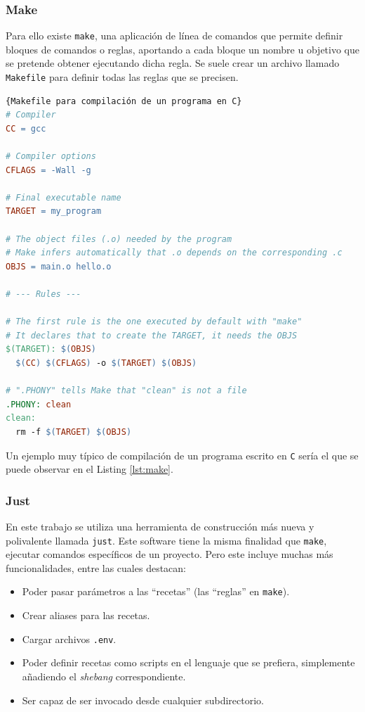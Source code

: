 \subsubsection*{Make}

Para ello existe \texttt{make}\cite{make}, una aplicación de línea de comandos que permite definir bloques de comandos o reglas, aportando a cada bloque un nombre u objetivo que se pretende obtener ejecutando dicha regla. Se suele crear un archivo llamado \texttt{Makefile} para definir todas las reglas que se precisen.

\begin{lstlisting}[language=make,label=lst:make]{Makefile para compilación de un programa en C}
# Compiler
CC = gcc

# Compiler options
CFLAGS = -Wall -g

# Final executable name
TARGET = my_program

# The object files (.o) needed by the program
# Make infers automatically that .o depends on the corresponding .c
OBJS = main.o hello.o

# --- Rules ---

# The first rule is the one executed by default with "make"
# It declares that to create the TARGET, it needs the OBJS
$(TARGET): $(OBJS)
  $(CC) $(CFLAGS) -o $(TARGET) $(OBJS)

# ".PHONY" tells Make that "clean" is not a file
.PHONY: clean
clean:
  rm -f $(TARGET) $(OBJS)
\end{lstlisting}

Un ejemplo muy típico de compilación de un programa escrito en \texttt{C} sería el que se puede observar en el Listing \ref{lst:make}.

\subsubsection*{Just}

En este trabajo se utiliza una herramienta de construcción más nueva y polivalente llamada \texttt{just}\cite{just}. Este software tiene la misma finalidad que \texttt{make}, ejecutar comandos específicos de un proyecto. Pero este incluye muchas más funcionalidades, entre las cuales destacan:

\begin{itemize}
  \item Poder pasar parámetros a las ``recetas'' (las ``reglas'' en \texttt{make}).
  \item Crear aliases para las recetas.
  \item Cargar archivos \texttt{.env}.
  \item Poder definir recetas como scripts en el lenguaje que se prefiera, simplemente añadiendo el \textit{shebang}\cite{shebang} correspondiente.
  \item Ser capaz de ser invocado desde cualquier subdirectorio.
\end{itemize}

